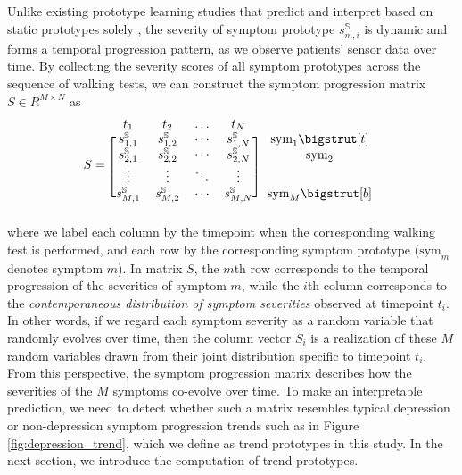 \documentclass[mnsc]{informs3b} %
\begin{document}
Unlike existing prototype learning studies that predict and interpret based on static prototypes solely \citep{chen_this_2019,ming_interpretable_2019}, the severity of symptom prototype $s_{m,i}^{\mathbb{S}}$ is dynamic and forms a temporal progression pattern, as we observe patients' sensor data over time.
By collecting the severity scores of all symptom prototypes across the sequence of walking tests, we can construct the symptom progression matrix $ S \in R^{M \times N}$ as 
\begin{equation}
\label{eq:sym_prog_mat}
S = \begin{blockarray}{ccccc}
 t_1 & t_2 & \dots & t_N & \\
\begin{block}{[cccc]c}
s_{1,1}^{\mathbb{S}} & s_{1,2}^{\mathbb{S}} &\cdots & s_{1,N}^{\mathbb{S}} & \text{sym}_1 \bigstrut[t] \\
s_{2,1}^{\mathbb{S}} & s_{2,2}^{\mathbb{S}} & \cdots & s_{2,N}^{\mathbb{S}} & \text{sym}_2  \\
  \vdots & \vdots & \ddots & \vdots & \\
 s_{M,1}^{\mathbb{S}} & s_{M,2}^{\mathbb{S}} &\cdots & s_{M,N}^{\mathbb{S}} & \text{sym}_M \bigstrut[b]\\
\end{block}
\end{blockarray}
\end{equation}
where we label each column by the timepoint when the corresponding walking test is performed, and each row by the corresponding symptom prototype ($\text{sym}_m$ denotes symptom $m$).
In matrix $S$, the $m$th row corresponds to the temporal progression of the severities of symptom $m$, while the $i$th column corresponds to the \textit{contemporaneous distribution of symptom severities} observed at timepoint $t_i$. In other words, if we regard each symptom severity as a random variable that randomly evolves over time, then the column vector $S_i$ is a realization of these $M$ random variables drawn from their joint distribution specific to timepoint $t_i$.
From this perspective, the symptom progression matrix describes how the severities of the $M$ symptoms co-evolve over time. 
To make an interpretable prediction, we need to detect whether such a matrix resembles typical depression or non-depression symptom progression trends such as in Figure \ref{fig:depression_trend}, which we define as trend prototypes in this study. In the next section, we introduce the computation of trend prototypes. 
\end{document}
